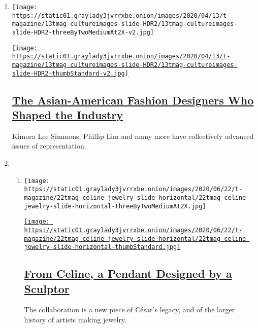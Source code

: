 \begin{enumerate}
\def\labelenumi{\arabic{enumi}.}
\item
  \texttt{[image: https://static01.graylady3jvrrxbe.onion/images/2020/04/13/t-magazine/13tmag-cultureimages-slide-HDR2/13tmag-cultureimages-slide-HDR2-threeByTwoMediumAt2X-v2.jpg]}

  \href{/interactive/2020/04/13/t-magazine/asian-american-fashion-designers.html}{\texttt{[image: https://static01.graylady3jvrrxbe.onion/images/2020/04/13/t-magazine/13tmag-cultureimages-slide-HDR2/13tmag-cultureimages-slide-HDR2-thumbStandard-v2.jpg]}}

  \hypertarget{the-asian-american-fashion-designers-who-shaped-the-industry}{%
  \subsection{\texorpdfstring{\href{/interactive/2020/04/13/t-magazine/asian-american-fashion-designers.html}{The
  Asian-American Fashion Designers Who Shaped the
  Industry}}{The Asian-American Fashion Designers Who Shaped the Industry}}\label{the-asian-american-fashion-designers-who-shaped-the-industry}}

  Kimora Lee Simmons, Phillip Lim and many more have collectively
  advanced issues of representation.
\item
  \begin{enumerate}
  \def\labelenumii{\arabic{enumii}.}
  \item
    \texttt{[image: https://static01.graylady3jvrrxbe.onion/images/2020/06/22/t-magazine/22tmag-celine-jewelry-slide-horizontal/22tmag-celine-jewelry-slide-horizontal-threeByTwoMediumAt2X.jpg]}

    \href{/2020/06/22/t-magazine/celine-cesar-jewelry.html}{\texttt{[image: https://static01.graylady3jvrrxbe.onion/images/2020/06/22/t-magazine/22tmag-celine-jewelry-slide-horizontal/22tmag-celine-jewelry-slide-horizontal-thumbStandard.jpg]}}

    \hypertarget{from-celine-a-pendant-designed-by-a-sculptor}{%
    \subsection{\texorpdfstring{\href{/2020/06/22/t-magazine/celine-cesar-jewelry.html}{From
    Celine, a Pendant Designed by a
    Sculptor}}{From Celine, a Pendant Designed by a Sculptor}}\label{from-celine-a-pendant-designed-by-a-sculptor}}

    The collaboration is a new piece of César's legacy, and of the
    larger history of artists making jewelry.


\end{enumerate}
\end{enumerate}
